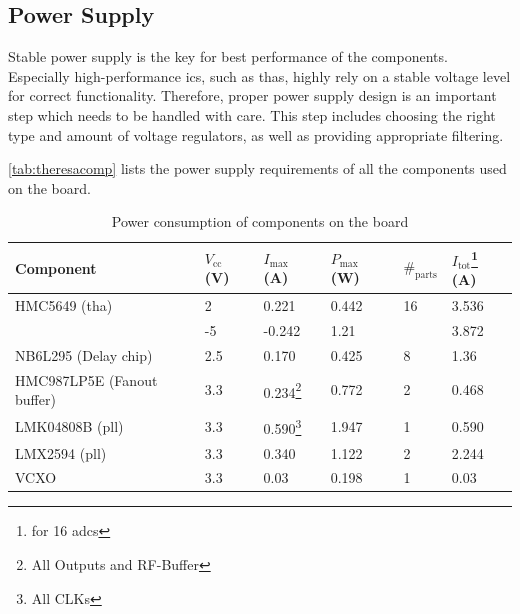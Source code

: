 \subsection{Power Supply}
Stable power supply is the key for best performance of the components. Especially high-performance \Glspl{ic}, such as \glspl{tha}, highly rely on a stable voltage level for correct functionality. 
Therefore, proper power supply design is an important step which needs to be handled with care.
This step includes choosing the right type and amount of voltage regulators, as well as providing appropriate filtering. 

\autoref{tab:theresacomp} lists the power supply requirements of all the components used on the board.

\begin{table}[tbh]
	\caption{Power consumption of components on the board}
	\label{tab:theresacomp}
	\begin{minipage}{\textwidth}
		\centering
		\begin{tabularx}{\textwidth}{Xlllll}
			\toprule
			\textbf{Component}          & $V_\text{cc}$ (V) & $I_\text{max}$ (A)                        & $P_\text{max}$ (W) & $\#_\text{parts}$ & $I_\text{tot}$\footnote{for 16 \glspl{adc}} (A) \\ \midrule
			HMC5649 (\gls{tha})          & 2                 & 0.221                                     & 0.442              & 16                & 3.536                                           \\
			                            & -5                & -0.242                                    & 1.21               &                   & 3.872                                           \\
			NB6L295 (Delay chip)              & 2.5              & 0.170                                     & 0.425 & 8                & 1.36                                            \\
			HMC987LP5E (Fanout buffer) & 3.3               & 0.234\footnote{All Outputs and RF-Buffer} & 0.772              & 2                 & 0.468                                           \\
			LMK04808B (\gls{pll})          & 3.3               & 0.590\footnote{All CLKs}                  & 1.947              & 1                 & 0.590                                         \\
			LMX2594 (\gls{pll})          & 3.3               & 0.340                & 1.122             & 2                 & 2.244 \\
			VCXO                        & 3.3               & 0.03                                      & 0.198              & 1                 & 0.03                                            \\ \bottomrule
		\end{tabularx}
	\end{minipage}
\end{table}
